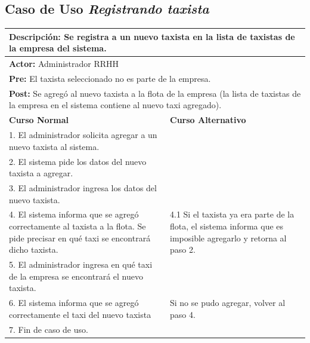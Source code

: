 \documentclass[a4paper]{article}
\begin{document}
\subsection{Caso de Uso \textit{Registrando taxista}}	
\begin{center}
\begin{tabular}{|p{10cm} | p{6cm}|}
\hline
\multicolumn{2}{|p{15cm}|}{\textbf{Descripci\'on:} Se registra a un nuevo taxista en la lista de taxistas de la empresa del sistema.} \\
\hline
\multicolumn{2}{|l|}{\textbf{Actor:} Administrador RRHH } \\
\hline
\multicolumn{2}{|p{15cm}|}{\textbf{Pre:} El taxista seleccionado no es parte de la empresa. } \\
\hline
\multicolumn{2}{|p{15cm}|}{\textbf{Post:} Se agreg\'o al nuevo taxista a la flota de la empresa (la lista de taxistas de la empresa en el sistema contiene al nuevo taxi agregado). }\\
\hline
\textbf{Curso Normal}  & \textbf{Curso Alternativo} \\ \hline
1. El administrador solicita agregar a un nuevo taxista al sistema. & \\ \hline
2. El sistema pide los datos del nuevo taxista a agregar. & \\ \hline
3. El administrador ingresa los datos del nuevo taxista. & \\ \hline
4. El sistema informa que se agreg\'o correctamente al taxista a la flota. Se pide precisar en qu\'e taxi se encontrar\'a dicho taxista. & 4.1 Si el taxista ya era parte de la flota, el sistema informa que es imposible agregarlo y retorna al paso 2. \\ \hline
5. El administrador ingresa en qu\'e taxi de la empresa se encontrar\'a el nuevo taxista. & \\ \hline
6. El sistema informa que se agreg\'o correctamente el taxi del nuevo taxista & Si no se pudo agregar, volver al paso 4. \\ \hline
7. Fin de caso de uso. & \\ \hline

\end{tabular}
\end{center}
\end{document}
